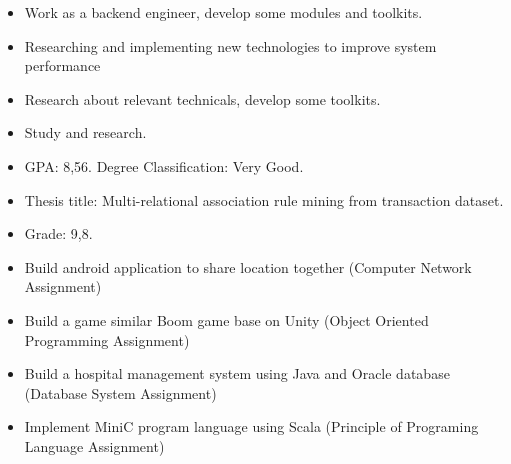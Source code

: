 \documentclass[10pt,a4paper,ragged2e]{altacv}
\begin{document}
\begin{paracol}{2}

\begin{itemize}
\item Work as a backend engineer, develop some modules and toolkits.
\item Researching and implementing new technologies to improve system performance
\end{itemize}

\divider

\begin{itemize}
\item Research about relevant technicals, develop some toolkits.
\end{itemize}

\divider

\begin{itemize}
\item Study and research.
\item GPA: 8,56. Degree Classification: Very Good.
\end{itemize}


\begin{itemize}
    \item Thesis title: Multi-relational association rule mining from transaction dataset.
    \item Grade: 9,8.
\end{itemize}

\divider

\begin{itemize}
\item Build android application to share location together (Computer
Network Assignment)
\item Build a game similar Boom game base on Unity (Object Oriented
Programming Assignment)
\item Build a hospital management system using Java and Oracle database
(Database System Assignment)
\item Implement MiniC program language using Scala (Principle of
Programing Language Assignment)
\end{itemize}
\newpage


\end{paracol}
\end{document}

